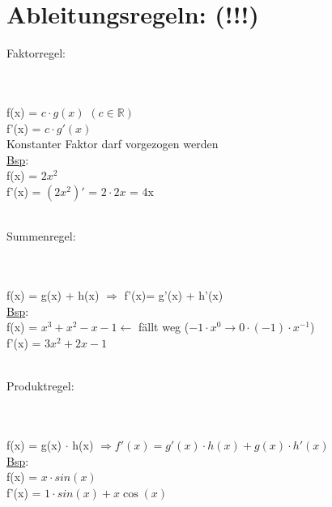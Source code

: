 \documentclass[../mainfile.tex]{article}
\begin{document}
	\section{Ableitungsregeln: (!!!)}
	\begin{enumerate} [i)]
		{\large\item Faktorregel:} \\\\
		f(x) = $c \cdot g(x)$	\qquad	$(c \in \mathbb{R})$ \\
		f'(x) = $c \cdot g'(x)$ \\
		Konstanter Faktor darf vorgezogen werden \\
		\underline{Bsp}: \\ 
		f(x) = $2x^2$ \\
		f'(x) = $(2x^2)'$ = $2 \cdot 2x$ = 4x \\\\
		
		{\large\item Summenregel:} \\\\
		f(x) = g(x) + h(x) $\Rightarrow$ f'(x)= g'(x) + h'(x) \\
		\underline{Bsp}: \\ 
		f(x) = $x^3+x^2-x-1 \leftarrow$ fällt weg ($-1 \cdot x^0 \rightarrow 0 \cdot (-1) \cdot x^{-1}$) \\
		f'(x) = $3x^2+2x-1$	\\\\
		
		{\large\item Produktregel:} \\\\ 
		f(x) = g(x) $\cdot$ h(x) $\Rightarrow f'(x)= g'(x) \cdot h(x) + g(x) \cdot h'(x)$ \\
		\underline{Bsp}: \\ 
		f(x) = $x \cdot sin(x)$ \\
		f'(x) = $1 \cdot sin(x) + x \cos(x)$
		
	\end{enumerate}
\end{document}
